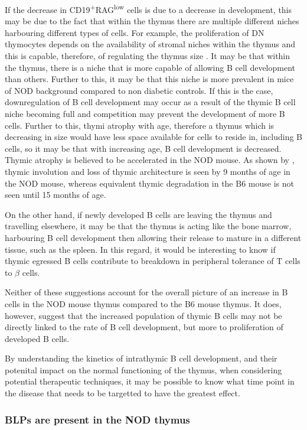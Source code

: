 If the decrease in CD19\textsuperscript{+}RAG\textsuperscript{low} cells is due to a decrease in development, this may be due to the fact that within the thymus there are multiple different niches harbouring different types of cells.
For example, the proliferation of DN thymocytes depends on the availability of stromal niches within the thymus and this is capable, therefore, of regulating the thymus size \citep{Prockop2004}.
It may be that within the thymus, there is a niche that is more capable of allowing B cell development than others.
Further to this, it may be that this niche is more prevalent in mice of NOD background compared to non diabetic controls.
If this is the case, downregulation of B cell development may occur as a result of the thymic B cell niche becoming full and competition may prevent the development of more B cells.
Further to this, thymi atrophy with age, therefore a thymus which is decreasing in size would have less space available for cells to reside in, including B cells, so it may be that with increasing age, B cell development is decreased.
Thymic atrophy is believed to be accelerated in the NOD mouse.
As shown by \citet{Ferreira2014}, thymic involution and loss of thymic architecture is seen by 9 months of age in the NOD mouse, whereas equivalent thymic degradation in the B6 mouse is not seen until 15 months of age.

On the other hand, if newly developed B cells are leaving the thymus and travelling elsewhere, it may be that the thymus is acting like the bone marrow, harbouring B cell development then allowing their release to mature in a different tissue, such as the spleen.
In this regard, it would be interesting to know if thymic egressed B cells contribute to breakdown in peripheral tolerance of T cells to $\beta$ cells. 

Neither of these suggestions account for the overall picture of an increase in B cells in the NOD mouse thymus compared to the B6 mouse thymus.
It does, however, suggest that the increased population of thymic B cells may not be directly linked to the rate of B cell development, but more to proliferation of developed B cells.

By understanding the kinetics of intrathymic B cell development, and their potenital impact on the normal functioning of the thymus, when considering potential therapeutic techniques, it may be possible to know what time point in the disease that needs to be targetted to have the greatest effect.

\subsubsection{BLPs are present in the NOD thymus}


